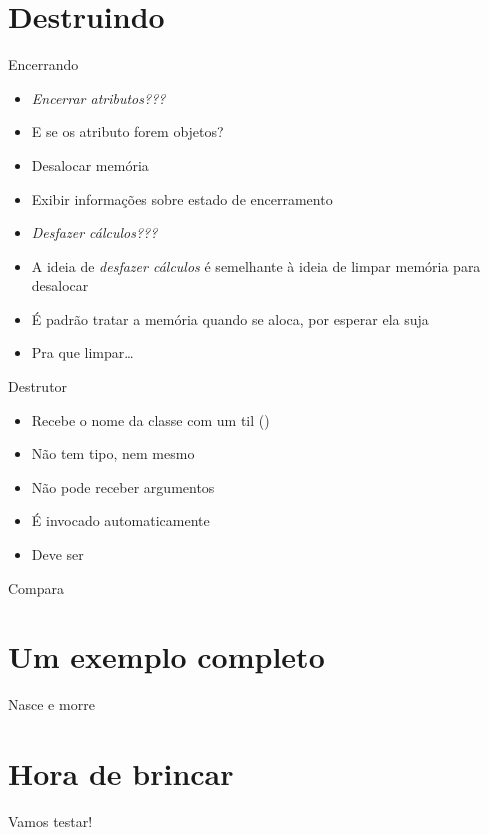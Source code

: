 \documentclass[14pt]{beamer}
\begin{document}
	\section{Destruindo}
	\begin{frame}{Encerrando}
		\begin{itemize}
			\presentationPause\item \textit{Encerrar atributos\presentationPause ???}
			\presentationPause\item E se os atributo forem objetos?
			\presentationPause\item Desalocar memória
			\presentationPause\item Exibir informações sobre estado de encerramento
			\presentationPause\item \textit{Desfazer cálculos\presentationPause ???}
			\presentationPause\item A ideia de \emph{desfazer cálculos} é semelhante à ideia de limpar memória para desalocar
			\presentationPause\item É padrão tratar a memória quando se aloca, por esperar ela suja
			\presentationPause\item Pra que limpar\dots
		\end{itemize}
	\end{frame}

	\begin{frame}{Destrutor}
		\begin{itemize}
			\presentationPause\item Recebe o nome da classe \presentationPause com um til (\basicCode{\~})
			\presentationPause\item Não tem tipo\presentationPause, nem mesmo 
			\presentationPause\item Não pode receber argumentos
			\presentationPause\item É invocado automaticamente
			\presentationPause\item Deve ser 
		\end{itemize}
		\presentationPause
	\end{frame}

	\begin{frame}{Compara}
		\only<1>{}
		\only<2>{}
	\end{frame}

	\section{Um exemplo completo}
	\begin{frame}{Nasce e morre}
		\presentationPause
	\end{frame}

	\section{Hora de brincar}
		\begin{frame}
			\begin{center}\Huge
				Vamos testar!
			\end{center}
		\end{frame}
	
\end{document}
